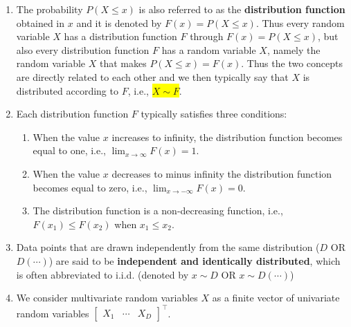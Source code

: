 \begin{enumerate}
    \item The probability $P(X \leq x)$ is also referred to as the \textbf{distribution function} obtained in $x$ and it is denoted by $F(x) = P(X \leq x)$.
    Thus every random variable $X$ has a distribution function $F$ through $F(x) = P(X \leq x)$, but also every distribution function $F$ has a random variable $X$, namely the random variable $X$ that makes $P(X \leq x) = F(x)$.
    Thus the two concepts are directly related to each other and we then typically say that $X$ is distributed according to $F$, i.e., \colorbox{yellow}{$X \sim F$}.
    \hfill \cite{statistics/book/Statistics-for-Data-Scientists/Maurits-Kaptein}

    \item Each distribution function $F$ typically satisfies three conditions:
    \begin{enumerate}
        \item When the value $x$ increases to infinity, the distribution function becomes equal to one, i.e., $\lim _{x\to \infty} F(x) = 1$.
        \hfill \cite{statistics/book/Statistics-for-Data-Scientists/Maurits-Kaptein}

        \item When the value $x$ decreases to minus infinity the distribution function becomes equal to zero, i.e., $\lim _{x\to -\infty} F(x) = 0$.
        \hfill \cite{statistics/book/Statistics-for-Data-Scientists/Maurits-Kaptein}

        \item The distribution function is a non-decreasing function, i.e., $F(x_1) \leq F(x_2)$ when $x_1 \leq x_2$.
        \hfill \cite{statistics/book/Statistics-for-Data-Scientists/Maurits-Kaptein}
    \end{enumerate}


    \item Data points that are drawn independently from the same distribution ($D$ OR $D(\cdots)$) are said to be \textbf{independent and identically distributed}, which is often abbreviated to i.i.d. (denoted by $x \sim D$ OR $x \sim D(\cdots)$)
    \hfill \cite{ml/book/Pattern-Recognition-And-Machine-Learning/Christopher-M-Bishop}

    \item We consider multivariate random variables $X$ as a finite vector of univariate random variables $\begin{bmatrix}X_1 & \cdots & X_D\end{bmatrix}^\top$. 
    \hfill \cite{mfml/book/mml/Deisenroth-Faisal-Ong}
\end{enumerate}








